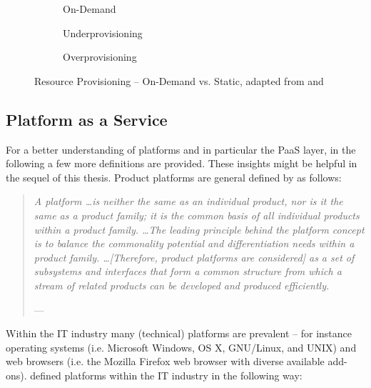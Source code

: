 \begin{figure}[tb]
	\centering
	\begin{subfigure}{.75\textwidth}
		\centering
		
		\caption{On-Demand}\label{fig:rpc}
	\end{subfigure}
	\begin{subfigure}[b]{.75\textwidth}
		\centering
		
		\caption{Underprovisioning}\label{fig:rpu}
	\end{subfigure}
	\begin{subfigure}[b]{.75\textwidth}
		\centering
		
		\caption{Overprovisioning}\label{fig:rpo}
	\end{subfigure}
	\caption[Resource Provisioning -- On-Demand vs. Static]{Resource Provisioning -- On-Demand vs. Static, adapted from \citet[p. 54]{Armbrust2010} and \citet[p. 127]{Iyer2010}}
	\label{fig:rp}
\end{figure}

\subsection{Platform as a Service}\label{ch:tf:paas:def}

For a better understanding of platforms and in particular the \ac{PaaS} layer, in the following a few more definitions are provided. These insights might be helpful in the sequel of this thesis. Product platforms are general defined by \citet{Halman2003} as follows:

\begin{quotation}{\slshape 
A platform \ldots is neither the same as an individual product, nor is it the same as a product family; it is the common basis of all individual products within a product family. \ldots The leading principle behind the platform concept is to balance the commonality potential and differentiation needs within a product family. \ldots [Therefore, product platforms are considered] as a set of subsystems and interfaces that form a common structure from which a stream of related products can be developed and produced efficiently.}
\vspace*{-7pt}
\begin{flushright}
	--- \citealp[pp. 150-151]{Halman2003}
\end{flushright}
\end{quotation}

Within the \ac{IT} industry many (technical) platforms are prevalent -- for instance operating systems (i.e. Microsoft Windows, OS X, GNU/Linux, and UNIX) and web browsers (i.e. the Mozilla Firefox web browser with diverse available add-ons). \citet{Poel2007} defined platforms within the \ac{IT} industry in the following way:

